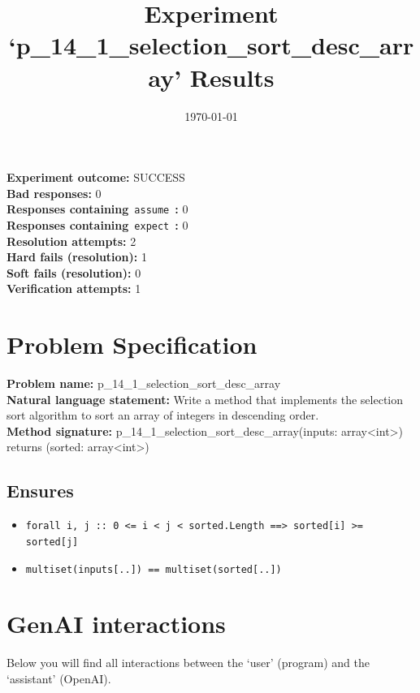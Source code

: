 \documentclass{article}
\begin{document}
\title{Experiment `p\_14\_1\_selection\_sort\_desc\_array' Results}
\author{\today}
\date{}
\maketitle
\textbf{Experiment outcome: }SUCCESS
\\\textbf{Bad responses: }0
\\\textbf{Responses containing}~\texttt{assume}~\textbf{: }0
\\\textbf{Responses containing}~\texttt{expect}~\textbf{: }0
\\\textbf{Resolution attempts: }2
\\\textbf{Hard fails (resolution): }1
\\\textbf{Soft fails (resolution): }0
\\\textbf{Verification attempts: }1
\section*{Problem Specification}
\textbf{Problem name: }p\_14\_1\_selection\_sort\_desc\_array
\\\textbf{Natural language statement: }Write a method that implements the selection sort algorithm to sort an array of integers in descending order.
\\\textbf{Method signature: }p\_14\_1\_selection\_sort\_desc\_array(inputs: array<int>) returns (sorted: array<int>)
\subsection*{Ensures}
\begin{itemize}
\item \texttt{forall i, j :: 0 <= i < j < sorted.Length ==> sorted[i] >= sorted[j]}
\item \texttt{multiset(inputs[..]) == multiset(sorted[..])}
\end{itemize}
\clearpage
\section*{GenAI interactions}
Below you will find all interactions between the `user' (program) and the `assistant' (OpenAI).
\end{document}
